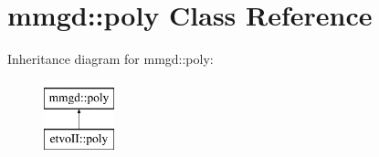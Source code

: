 \hypertarget{classmmgd_1_1poly}{}\section{mmgd\+:\+:poly Class Reference}
\label{classmmgd_1_1poly}
Inheritance diagram for mmgd\+:\+:poly\+:\begin{figure}[H]
\begin{center}
\leavevmode
\includegraphics[height=2.000000cm]{classmmgd_1_1poly}
\end{center}
\end{figure}
